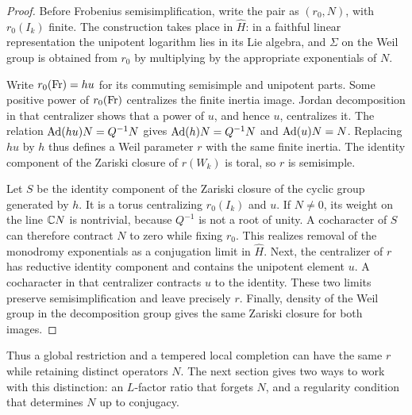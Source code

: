 \begin{proof}
Before Frobenius semisimplification, write the pair as $(r_0,N)$, with
$r_0(I_k)$ finite. The construction takes place in $\widehat H$:
in a faithful linear representation the unipotent logarithm lies in
its Lie algebra, and $\Sigma$ on the Weil group is obtained from $r_0$
by multiplying by the appropriate exponentials of $N$.

Write $r_0(\operatorname{Fr})=hu$ for its commuting semisimple and unipotent parts.
Some positive power of $r_0(\operatorname{Fr})$ centralizes the finite inertia image.
Jordan decomposition in that centralizer shows that a power of $u$,
and hence $u$, centralizes it. The relation
$\operatorname{Ad}(hu)N=Q^{-1}N$ gives $\operatorname{Ad}(h)N=Q^{-1}N$ and $\operatorname{Ad}(u)N=N$.
Replacing $hu$ by $h$ thus defines a Weil parameter $r$ with the same
finite inertia. The identity component of the Zariski closure of $r(W_k)$
is toral, so $r$ is semisimple.

Let $S$ be the identity component of the Zariski closure of the cyclic
group generated by $h$. It is a torus centralizing $r_0(I_k)$ and $u$.
If $N\ne0$, its weight on the line $\mathbb C N$ is nontrivial, because
$Q^{-1}$ is not a root of unity. A cocharacter of $S$ can therefore
contract $N$ to zero while fixing $r_0$. This realizes removal of the
monodromy exponentials as a conjugation limit in $\widehat H$.
Next, the centralizer of $r$ has reductive identity component and contains
the unipotent element $u$. A cocharacter in that centralizer contracts
$u$ to the identity. These two limits preserve semisimplification and
leave precisely $r$. Finally, density of the Weil group in the
decomposition group gives the same Zariski closure for both images.
\end{proof}

Thus a global restriction and a tempered local completion can have the
same $r$ while retaining distinct operators $N$. The next section gives
two ways to work with this distinction: an $L$-factor ratio that forgets
$N$, and a regularity condition that determines $N$ up to conjugacy.
